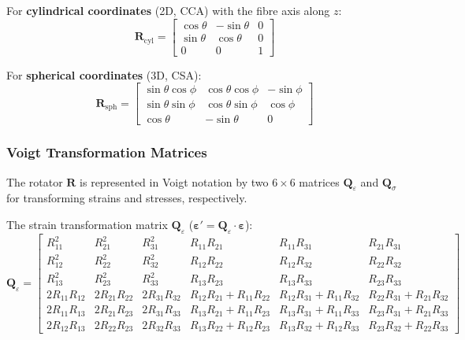 \documentclass[oneside, 12pt, a4paper, bibliography=totoc]{book}
\newcommand{\bs}[1]{\bm{#1}}                       %
\begin{document}
For \textbf{cylindrical coordinates} (2D, CCA) with the fibre axis along $z$:
%
\begin{equation}
    \bs{R}_{\text{cyl}} =
    \begin{bmatrix}
        \cos\theta & -\sin\theta & 0 \\
        \sin\theta & \cos\theta & 0 \\
        0 & 0 & 1
    \end{bmatrix}
    \label{eq:R_cylindrical}
\end{equation}

For \textbf{spherical coordinates} (3D, CSA):
%
\begin{equation}
    \bs{R}_{\text{sph}} =
    \begin{bmatrix}
        \sin\theta\cos\phi & \cos\theta\cos\phi & -\sin\phi \\
        \sin\theta\sin\phi & \cos\theta\sin\phi & \cos\phi \\
        \cos\theta & -\sin\theta & 0
    \end{bmatrix}
    \label{eq:R_spherical}
\end{equation}

\subsubsection{Voigt Transformation Matrices}
\label{subsec:Q_matrices}

The rotator $\bs{R}$ is represented in Voigt notation by two $6 \times 6$ matrices $\bs{Q}_\varepsilon$ and $\bs{Q}_\sigma$ for transforming strains and stresses, respectively. 

The strain transformation matrix $\bs{Q}_\varepsilon$ ($\bs{\varepsilon}' = \bs{Q}_\varepsilon \cdot \bs{\varepsilon}$):
%
\begin{equation}
    \bs{Q}_\varepsilon =
    \begin{bmatrix}
        R_{11}^2 & R_{21}^2 & R_{31}^2 & R_{11}R_{21} & R_{11}R_{31} & R_{21}R_{31} \\
        R_{12}^2 & R_{22}^2 & R_{32}^2 & R_{12}R_{22} & R_{12}R_{32} & R_{22}R_{32} \\
        R_{13}^2 & R_{23}^2 & R_{33}^2 & R_{13}R_{23} & R_{13}R_{33} & R_{23}R_{33} \\
        2R_{11}R_{12} & 2R_{21}R_{22} & 2R_{31}R_{32} & R_{12}R_{21}+R_{11}R_{22} & R_{12}R_{31}+R_{11}R_{32} & R_{22}R_{31}+R_{21}R_{32} \\
        2R_{11}R_{13} & 2R_{21}R_{23} & 2R_{31}R_{33} & R_{13}R_{21}+R_{11}R_{23} & R_{13}R_{31}+R_{11}R_{33} & R_{23}R_{31}+R_{21}R_{33} \\
        2R_{12}R_{13} & 2R_{22}R_{23} & 2R_{32}R_{33} & R_{13}R_{22}+R_{12}R_{23} & R_{13}R_{32}+R_{12}R_{33} & R_{23}R_{32}+R_{22}R_{33}
    \end{bmatrix}
    \label{eq:Q_epsilon}
\end{equation}
\end{document}
